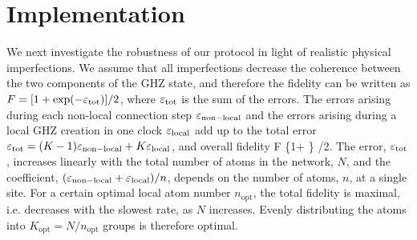 \section{Implementation}
We next investigate  the robustness of our  protocol  in  light of realistic physical imperfections. 
We assume that all imperfections decrease the coherence between the two
components of the GHZ state, and therefore the fidelity can be written as
$F = [1 + \exp(-\varepsilon_\mathrm{tot})]/2$, where $\varepsilon_\mathrm{tot}$ is the sum of the
errors.
The errors arising during each non-local connection step
$\varepsilon_\mathrm{non-local}$ and the errors arising during a local GHZ creation
in one clock $\varepsilon_\mathrm{local}$ add up to the total error $\varepsilon_\mathrm{tot} =
(K-1)\varepsilon_\mathrm{non-local} + K\varepsilon_\mathrm{local}$, and overall fidelity
\bel
	F \geq \left\{1+ \exp{}\right\} /2.
\eel
The error, $\varepsilon_\mathrm{tot}$, increases linearly with the total
number of atoms in the network, $N$, and the coefficient,
$(\varepsilon_\mathrm{non-local} + \varepsilon_\mathrm{local})/n$, depends on the number of atoms,
$n$, at a single site. For a certain optimal local atom
number $n_\mathrm{opt}$, the total fidelity is maximal, i.e.
decreases with the slowest rate, as $N$ increases. Evenly distributing
the atoms into $K_\mathrm{opt} = N/n_\mathrm{opt}$ groups is therefore optimal.


